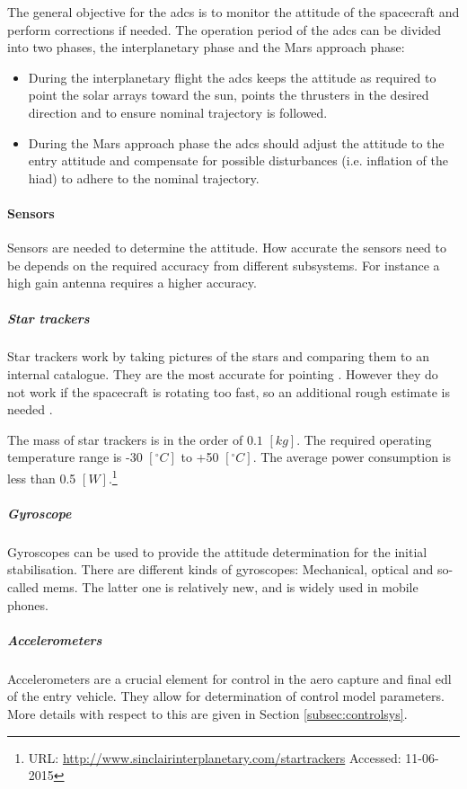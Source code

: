The general objective for the \gls{adcs} is to monitor the attitude of the spacecraft and perform corrections if needed. The operation period of the \gls{adcs} can be divided into two phases, the interplanetary phase and the Mars approach phase:
\begin{itemize}
\item During the interplanetary flight the \gls{adcs} keeps the attitude as required to point the solar arrays toward the sun, points the thrusters in the desired direction and to ensure nominal trajectory is followed.

\item During the Mars approach phase the \gls{adcs} should adjust the attitude to the entry attitude and compensate for possible disturbances (i.e. inflation of the \gls{hiad}) to adhere to the nominal trajectory.
\end{itemize}
\paragraph{Sensors} Sensors are needed to determine the attitude. How accurate the sensors need to be depends on the required accuracy from different subsystems. For instance a high gain antenna requires a higher accuracy. 

\subparagraph{Star trackers}
Star trackers work by taking pictures of the stars and comparing them to an internal catalogue. They are the most accurate for pointing \cite{CarlChristianLiebe1995}. However they do not work if the spacecraft is rotating too fast, so an additional rough estimate is needed \cite[p. 584]{Wertz2011}. 

The mass of star trackers is in the order of $0.1$ $\left[kg\right]$. The required operating temperature range is -30 $\left[^\circ C\right]$ to +50 $\left[^\circ C\right]$. The average power consumption is less than 0.5 $\left[W\right]$.\footnote{URL: \url{http://www.sinclairinterplanetary.com/startrackers} Accessed: 11-06-2015}

\subparagraph{Gyroscope}                        
Gyroscopes can be used to provide the attitude determination for the initial stabilisation. There are different kinds of gyroscopes: Mechanical, optical and so-called \gls{mems}. The latter one is relatively new, and is widely used in mobile phones. 

\subparagraph{Accelerometers}                        
Accelerometers are a crucial element for control in the aero capture and final \gls{edl} of the entry vehicle. They allow for determination of control model parameters. More details with respect to this are given in Section \ref{subsec:controlsys}.

